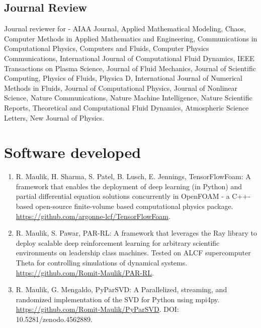 \documentclass[letterpaper]{article}
\renewenvironment{itemize}{
  \begin{list}{}{
    \setlength{\leftmargin}{1.5em}
  }
}{
  \end{list}
}
\begin{document}
\subsection*{Journal Review}

\begin{itemize}
  \item Journal reviewer for - AIAA Journal, Applied Mathematical Modeling, Chaos, Computer Methods in Applied Mathematics and Engineering, Communications in Computational Physics, Computers and Fluids, Computer Physics Communications, International Journal of Computational Fluid Dynamics, IEEE Transactions on Plasma Science, Journal of Fluid Mechanics, Journal of Scientific Computing, Physics of Fluids, Physica D, International Journal of Numerical Methods in Fluids, Journal of Computational Physics, Journal of Nonlinear Science, Nature Communications, Nature Machine Intelligence, Nature Scientific Reports, Theoretical and Computational Fluid Dynamics, Atmospheric Science Letters, New Journal of Physics.
\end{itemize}

\section*{Software developed}

\begin{enumerate}

\item R. Maulik, H. Sharma, S. Patel, B. Lusch, E. Jennings, TensorFlowFoam: A framework that enables the deployment of deep learning (in Python) and partial differential equation solutions concurrently in OpenFOAM - a C++-based open-source finite-volume based computational physics package. \url{https://github.com/argonne-lcf/TensorFlowFoam}.

\item R. Maulik, S. Pawar, PAR-RL: A framework that leverages the Ray library to deploy scalable deep reinforcement learning for arbitrary scientific environments on leadership class machines. Tested on ALCF supercomputer Theta for controlling simulations of dynamical systems. \url{https://github.com/Romit-Maulik/PAR-RL}.

\item R. Maulik, G. Mengaldo, PyParSVD: A Parallelized, streaming, and randomized implementation of the SVD for Python using mpi4py. \url{https://github.com/Romit-Maulik/PyParSVD}. DOI: 10.5281/zenodo.4562889.

\end{enumerate}
\end{document}
